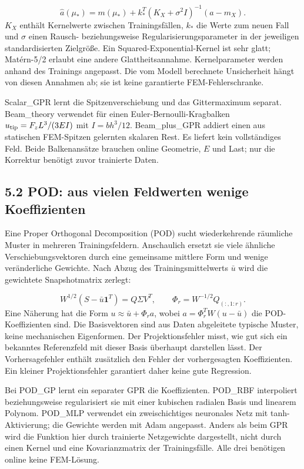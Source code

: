 \documentclass[11pt,a4paper]{article}
\begin{document}
\[\hat a(\mu_*)=m(\mu_*)+k_*^T(K_X+\sigma^2I)^{-1}(a-m_X).\]
$K_X$ enthält Kernelwerte zwischen Trainingsfällen, $k_*$ die Werte zum neuen Fall und $\sigma$ einen Rausch- beziehungsweise Regularisierungsparameter in der jeweiligen standardisierten Zielgröße. Ein Squared-Exponential-Kernel ist sehr glatt; Matérn-5/2 erlaubt eine andere Glattheitsannahme. Kernelparameter werden anhand des Trainings angepasst. Die vom Modell berechnete Unsicherheit hängt von diesen Annahmen ab; sie ist keine garantierte FEM-Fehlerschranke.

Scalar\_\allowbreak{}GPR lernt die Spitzenverschiebung und das Gittermaximum separat. Beam\_\allowbreak{}theory verwendet für einen Euler-Bernoulli-Kragbalken $u_{\rm tip}=F_zL^3/(3EI)$ mit $I=bh^3/12$. Beam\_\allowbreak{}plus\_\allowbreak{}GPR addiert einen aus statischen FEM-Spitzen gelernten skalaren Rest. Es liefert kein vollständiges Feld. Beide Balkenansätze brauchen online Geometrie, $E$ und Last; nur die Korrektur benötigt zuvor trainierte Daten.

\subsection{5.2 POD: aus vielen Feldwerten wenige Koeffizienten}
Eine Proper Orthogonal Decomposition (POD) sucht wiederkehrende räumliche Muster in mehreren Trainingsfeldern. Anschaulich ersetzt sie viele ähnliche Verschiebungsvektoren durch eine gemeinsame mittlere Form und wenige veränderliche Gewichte. Nach Abzug des Trainingsmittelwerts $\bar u$ wird die gewichtete Snapshotmatrix zerlegt:

\[W^{1/2}(S-\bar u\mathbf1^T)=Q\Sigma V^T,\qquad \Phi_r=W^{-1/2}Q_{(:,1:r)}.\]
Eine Näherung hat die Form $u\approx\bar u+\Phi_ra$, wobei $a=\Phi_r^TW(u-\bar u)$ die POD-Koeffizienten sind. Die Basisvektoren sind aus Daten abgeleitete typische Muster, keine mechanischen Eigenformen. Der Projektionsfehler misst, wie gut sich ein bekanntes Referenzfeld mit dieser Basis überhaupt darstellen lässt. Der Vorhersagefehler enthält zusätzlich den Fehler der vorhergesagten Koeffizienten. Ein kleiner Projektionsfehler garantiert daher keine gute Regression.

Bei POD\_\allowbreak{}GP lernt ein separater GPR die Koeffizienten. POD\_\allowbreak{}RBF interpoliert beziehungsweise regularisiert sie mit einer kubischen radialen Basis und linearem Polynom. POD\_\allowbreak{}MLP verwendet ein zweischichtiges neuronales Netz mit tanh-Aktivierung; die Gewichte werden mit Adam angepasst. Anders als beim GPR wird die Funktion hier durch trainierte Netzgewichte dargestellt, nicht durch einen Kernel und eine Kovarianzmatrix der Trainingsfälle. Alle drei benötigen online keine FEM-Lösung.
\end{document}
